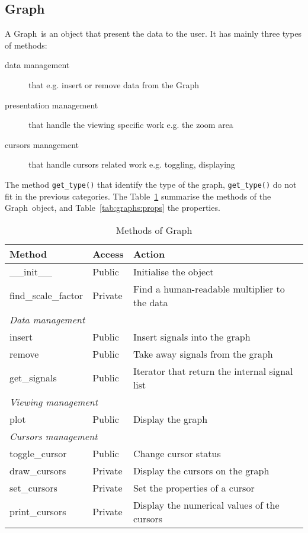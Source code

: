 \documentclass[a4paper,11pt]{article}
\newcommand{\meth}[1]{\texttt{#1()}}
\newcommand{\cls}[1]{\textsf{#1}}
\newcommand{\graph}{\cls{Graph}}
\begin{document}
\subsection{Graph}
\label{sec:graphs:graph}
A \graph\ is an object that present the data to the user.
It has mainly three types of methods:
\begin{description}
\item[data management] that e.g. insert or remove data from the \graph
\item[presentation management] that handle the viewing specific work e.g. the zoom area
\item[cursors management] that handle cursors related work e.g. toggling, displaying
\end{description}
The method \meth{get\_type} that identify the type of the graph, \meth{get\_type} do not fit in the previous categories.
The Table~\ref{tab:graphs:meth} summarise the methods of the \graph\ object, and Table~\ref{tab:graphs:props} the properties.
\begin{table}[htbp]
  \centering\sf\small
  \begin{tabular}{lll}
    \hline
    Method & Access & Action \\
    \hline
    \_\_init\_\_ & Public & Initialise the object \\
    find\_scale\_factor & Private & Find a human-readable multiplier to the data \\
    \multicolumn{3}{l}{\textit{Data management}} \\
    insert & Public & Insert signals into the graph\\
    remove & Public & Take away signals from the graph\\
    get\_signals & Public & Iterator that return the internal signal list\\
    \multicolumn{3}{l}{\textit{Viewing management}} \\
    plot & Public & Display the graph\\
    \multicolumn{3}{l}{\textit{Cursors management}} \\
    toggle\_cursor & Public & Change cursor status \\
    draw\_cursors & Private & Display the cursors on the graph\\
    set\_cursors & Private & Set the properties of a cursor\\
    print\_cursors & Private & Display the numerical values of the cursors\\
    \hline
  \end{tabular}
  \caption{Methods of \graph}
  \label{tab:graphs:meth}
\end{table}
\end{document}

